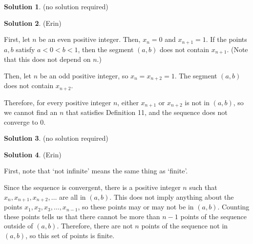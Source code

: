 \documentclass{article}
\theoremstyle{definition}
\newtheorem{solution}{Solution}
\begin{document}
\begin{solution} %
(no solution required)
\end{solution}

\begin{solution} %
(Erin)

First, let $n$ be an even positive integer.
Then, $x_n = 0$ and $x_{n+1} = 1$.
If the points $a, b$ satisfy $a < 0 < b < 1$, then the segment $(a, b)$ does not contain $x_{n+1}$.
(Note that this does not depend on $n$.)

Then, let $n$ be an odd positive integer, so $x_n = x_{n+2} = 1$.
The segment $(a, b)$ does not contain $x_{n+2}$.

Therefore, for every positive integer $n$, either $x_{n+1}$ or $x_{n+2}$ is not in $(a, b)$, so we cannot find an $n$ that satisfies Definition 11, and the sequence does not converge to $0$.
\end{solution}

\begin{solution} %
(no solution required)
\end{solution}

\begin{solution} %
(Erin)

First, note that `not infinite' means the same thing as `finite'.

Since the sequence is convergent, there is a positive integer $n$ such that $x_n, x_{n+1}, x_{n+2}, \dots$ are all in $(a, b)$.
This does not imply anything about the points $x_1, x_2, x_3, \dots, x_{n-1}$, so these points may or may not be in $(a, b)$.
Counting these points tells us that there cannot be more than $n-1$ points of the sequence outside of $(a, b)$.
Therefore, there are not $n$ points of the sequence not in $(a, b)$, so this set of points is finite. 
\end{solution}
\end{document}
